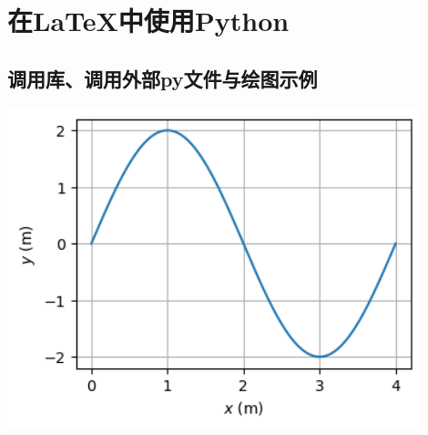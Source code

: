 \documentclass{ctexart}
\begin{document}
  \section{在LaTeX中使用Python}

  \subsection{调用库、调用外部py文件与绘图示例}
 
  \includegraphics[width=0.9\textwidth]{draw_test.png}
\end{document}
